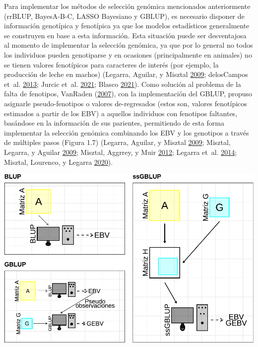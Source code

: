 \documentclass[11pt,spanish,a4paper,oneside,]{book} %
\begin{document}
Para implementar los métodos de selección genómica mencionados anteriormente (rrBLUP, BayesA-B-C, LASSO Bayesiano y GBLUP), es necesario disponer de información genotípica y fenotípica ya que los modelos estadísticos generalmente se construyen en base a esta información. Esta situación puede ser desventajosa al momento de implementar la selección genómica, ya que por lo general no todos los individuos pueden genotiparse y en ocasiones (principalmente en animales) no se tienen valores fenotípicos para caracteres de interés (por ejemplo, la producción de leche en machos) (Legarra, Aguilar, y Misztal \protect\hyperlink{ref-cite:17}{2009}; delosCampos et~al. \protect\hyperlink{ref-cite:31}{2013}; Jurcic et~al. \protect\hyperlink{ref-cite:11}{2021}; Blasco \protect\hyperlink{ref-cite:21}{2021}). Como solución al problema de la falta de fenotipos, VanRaden (\protect\hyperlink{ref-cite:39}{2007}), con la implementación del GBLUP, propuso asignarle pseudo-fenotipos o valores de-regresados (estos son, valores fenotípicos estimados a partir de los EBV) a aquellos individuos con fenotipos faltantes, basándose en la información de sus parientes, permitiendo de esta forma implementar la selección genómica combinando los EBV y los genotipos a través de múltiples pasos (Figura 1.7) (Legarra, Aguilar, y Misztal \protect\hyperlink{ref-cite:17}{2009}; Misztal, Legarra, y Aguilar \protect\hyperlink{ref-cite:16}{2009}; Misztal, Aggrrey, y Muir \protect\hyperlink{ref-cite:14}{2012}; Legarra et~al. \protect\hyperlink{ref-cite:15}{2014}; Misztal, Lourenco, y Legarra \protect\hyperlink{ref-cite:18}{2020}).

\begin{center}\includegraphics[width=1\linewidth]{figures/BLUPs} \end{center}
\end{document}
